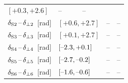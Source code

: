 \begin{table}[htbp]
\begin{tabular}{lllcc}
{                                                 %
                                                 $[\text{+0.3},   \text{+2.6}]$}    &  --  &  --  \\
    $\delSperp[2]$~[rad]  &   \multicolumn{2}{l}{%
                                                 $[\text{+0.6},   \text{+2.7}]$}    &  --  &  --  \\
    $\delSperp[3]$~[rad]  &   \multicolumn{2}{l}{%
                                                 $[\text{+0.1},   \text{+2.7}]$}    &  --  &  --  \\
    $\delSperp[4]$~[rad]  &   \multicolumn{2}{l}{%
                                                 $[\text{\tm2.3}, \text{+0.1}]$}    &  --  &  --  \\
    $\delSperp[5]$~[rad]  &   \multicolumn{2}{l}{%
                                                 $[\text{\tm2.7}, \text{\tm0.2}]$}  &  --  &  --  \\
    $\delSperp[6]$~[rad]  &   \multicolumn{2}{l}{%
                                                 $[\text{\tm1.6}, \text{\tm0.6}]$}  &  --  &  --  \\
    \hline
  \end{tabular}
\end{table}

